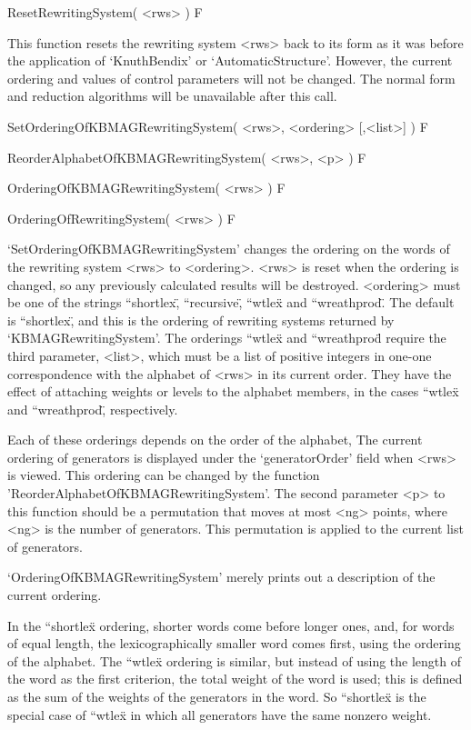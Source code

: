 \>ResetRewritingSystem( <rws> ) F

This function resets the rewriting system <rws> back to its form as it
was before the application of `KnuthBendix' or `AutomaticStructure'.
However, the current ordering  and values  of control  parameters  will not
be changed. The normal form and  reduction algorithms will  be unavailable
after  this call.



\>SetOrderingOfKBMAGRewritingSystem( <rws>, <ordering> [,<list>] ) F

\>ReorderAlphabetOfKBMAGRewritingSystem( <rws>, <p> ) F

\>OrderingOfKBMAGRewritingSystem( <rws> ) F

\>OrderingOfRewritingSystem( <rws> ) F

`SetOrderingOfKBMAGRewritingSystem' changes  the ordering on  the  words
of the rewriting system  <rws>  to   <ordering>.
<rws> is reset when the ordering is changed, so any previously
calculated results will be destroyed.
<ordering> must  be  one of the  strings ``shortlex\",
``recursive\", {``wtlex\"}  and  ``wreathprod\".  The
default is ``shortlex\", and this is the ordering of rewriting systems
returned  by    `KBMAGRewritingSystem'.   The   orderings    {``wtlex\"}
 and {``wreathprod\"} require the third parameter, <list>,  which must be a
list  of  positive integers  in   one-one correspondence  with the
alphabet of <rws> in its current order.
They have  the effect of attaching weights or
levels to the alphabet members, in the cases {``wtlex\"} and ``wreathprod\",
respectively.

Each  of these orderings depends on  the order of  the alphabet, The
current ordering of generators is displayed under the `generatorOrder'
field  when <rws> is  viewed.  This ordering can   be changed  by the
function  'ReorderAlphabetOfKBMAGRewritingSystem'.
The  second  parameter <p> to  this
function should be a permutation that moves at most <ng> points, where
<ng> is  the number of generators.  This permutation is applied to the
current list of generators.

`OrderingOfKBMAGRewritingSystem' merely prints out a description of
the current ordering.

In the {``shortlex\"} ordering, shorter words come before longer ones,
and,  for words  of  equal length, the  lexicographically smaller word
comes   first, using the   ordering   of the alphabet.
The   {``wtlex\"}  ordering is similar,   but
instead of  using the length  of the word  as the first criterion, the
total weight of the word  is used; this  is defined as  the sum of the
weights of   the generators  in  the word.   So {``shortlex\"} is  the
special   case of {``wtlex\"} in which   all  generators have the same
nonzero weight.

